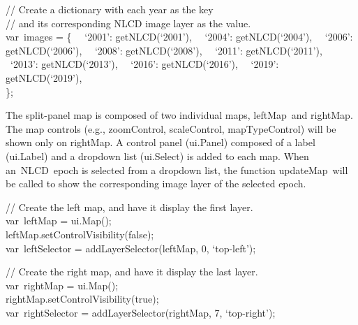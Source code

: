 \documentclass[
  letterpaper,
  DIV=11,
  numbers=noendperiod]{scrreprt}
\begin{document}
// Create a dictionary with each year as the key\\
// and its corresponding NLCD image layer as the value.\\
var~images = \{~ ~`2001': getNLCD(`2001'),~ ~`2004': getNLCD(`2004'),~
~`2006': getNLCD(`2006'),~ ~`2008': getNLCD(`2008'),~ ~`2011':
getNLCD(`2011'),~ ~`2013': getNLCD(`2013'),~ ~`2016': getNLCD(`2016'),~
~`2019': getNLCD(`2019'),\\
\};

The split-panel map is composed of two individual maps, leftMap~and
rightMap. The map controls (e.g., zoomControl, scaleControl,
mapTypeControl) will be shown only on rightMap. A control panel
(ui.Panel) composed of a label (ui.Label) and a dropdown list
(ui.Select) is added to each map. When an~NLCD~epoch is selected from a
dropdown list, the function updateMap~will be called to show the
corresponding image layer of the selected epoch.

// Create the left map, and have it display the first layer.\\
var~leftMap = ui.Map();\\
leftMap.setControlVisibility(false);\\
var~leftSelector = addLayerSelector(leftMap, 0, `top-left');

// Create the right map, and have it display the last layer.\\
var~rightMap = ui.Map();\\
rightMap.setControlVisibility(true);\\
var~rightSelector = addLayerSelector(rightMap, 7, `top-right');
\end{document}
